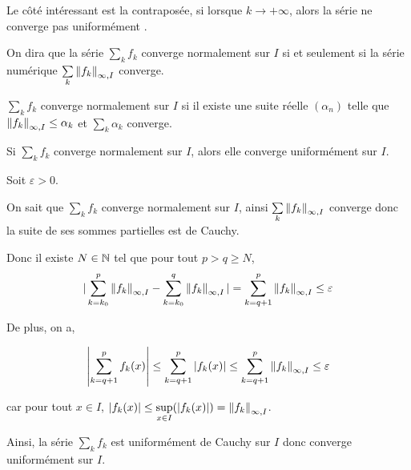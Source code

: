 \documentclass[a4paper, 12pt]{article}
\begin{document}
\begin{remarque}
    Le côté intéressant est la contraposée, si  lorsque $k \to +\infty$, alors la série ne converge pas uniformément .
\end{remarque}

\begin{definition}
    On dira que la série $\sum\limits_k f_k$ converge normalement sur $I$ si et seulement si
    la série numérique $\sum\limits_k \left\lVert f_k\right\rVert_{\infty, I}$ converge.
\end{definition}

\begin{methode}
    $\sum\limits_k f_k$ converge normalement sur $I$ si il existe une suite réelle $(\alpha_n)$ telle que
    $\left\lVert f_k\right\rVert_{\infty, I} \leq \alpha_k$ et $\sum\limits_k \alpha_k$ converge.
\end{methode}

\begin{theoreme}{}{}
    Si $\sum\limits_k f_k$ converge normalement sur $I$, alors elle converge uniformément sur $I$.
\end{theoreme}

\begin{demonstration}
    Soit $\varepsilon > 0$.

    On sait que $\sum\limits_k f_k$ converge normalement sur $I$, ainsi $\sum\limits_k \left\lVert f_k\right\rVert_{\infty, I}$ converge donc la suite de ses sommes partielles est de Cauchy.
    
    Donc il existe $N \in \mathbb{N}$ tel que pour tout $p > q \geq N$,
    $$
    |\sum\limits_{k=k_0}^p \left\lVert f_k\right\rVert_{\infty, I} - \sum\limits_{k=k_0}^q \left\lVert f_k\right\rVert_{\infty, I}| = \sum\limits_{k=q+1}^p \left\lVert f_k\right\rVert_{\infty, I} \leq \varepsilon
    $$

    De plus, on a,

    $$
    \left| \sum_{k=q+1}^p f_k(x) \right| \leq \sum_{k=q+1}^p |f_k(x)| \leq \sum_{k=q+1}^p \left\lVert f_k\right\rVert_{\infty, I} \leq \varepsilon
    $$

    car pour tout $x \in I$, $|f_k(x)| \leq \sup\limits_{x \in I}(|f_k(x)|) = \left\lVert f_k\right\rVert_{\infty, I}$.

    Ainsi, la série $\sum\limits_k f_k$ est uniformément de Cauchy sur $I$ donc converge uniformément sur $I$.
\end{demonstration}
\end{document}
